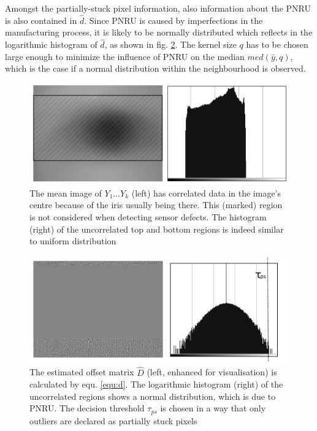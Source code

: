 \documentclass[10pt,twocolumn,letterpaper]{article}
\begin{document}
Amongst the partially-stuck pixel information, also information about the PNRU is also contained in $\hat{d}$. Since PNRU is caused by imperfections in the manufacturing process, it is likely to be normally distributed which reflects in the logarithmic histogram of $\hat{d}$, as shown in fig. \ref{fig:defectMat}. The kernel size $q$ has to be chosen large enough to minimize the influence of PNRU on the median $med(\bar{y},q)$, which is the case if a normal distribution within the neighbourhood is observed.


\begin{figure}[h]
  \centering
  \includegraphics[width=\linewidth]{img/correlated.png}
  \caption{The mean image of $Y_1 \dots Y_k$ (left) has correlated data in the image's centre because of the iris usually being there. This (marked) region is not considered when detecting sensor defects. The histogram (right) of the uncorrelated top and bottom regions is indeed similar to uniform distribution}
  \label{fig:correlated}
\end{figure}

\begin{figure}[h]
  \centering
  \includegraphics[width=\linewidth]{img/defectMatWithTau.png}
  \caption{The estimated offset matrix $\hat{D}$ (left, enhanced for visualisation) is calculated by equ. \ref{equ:d}. The logarithmic histogram (right) of the uncorrelated regions shows a normal distribution, which is due to PNRU. The decision threshold $\tau_{ps}$ is chosen in a way that only outliers are declared as partially stuck pixels}
  \label{fig:defectMat}
\end{figure}
\end{document}
